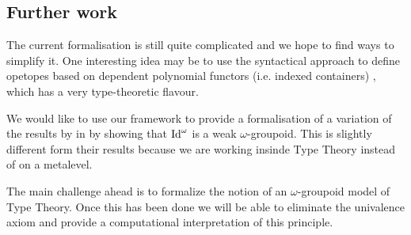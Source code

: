 \subsection{Further work}
The current formalisation is still
quite complicated and we hope to find ways to simplify it. One interesting
idea may be to use the syntactical approach to define opetopes based on
dependent polynomial functors (i.e. indexed containers) \cite{opetopes},
which has a very type-theoretic flavour.  

We would like to use our framework to provide a formalisation of a
variation of the results by in
\cite{lumsdaine10:weak-o-categories,berg08:types-are} by showing that
$\mathrm{Id}^\omega$ is a weak $\omega$-groupoid. This is slightly different form
their results because we are working insinde Type Theory instead of on
a metalevel.

The main challenge ahead is to formalize the notion of an
$\omega$-groupoid model of Type Theory. Once this has been done we
will be able to eliminate the univalence axiom and provide a
computational interpretation of this principle.



